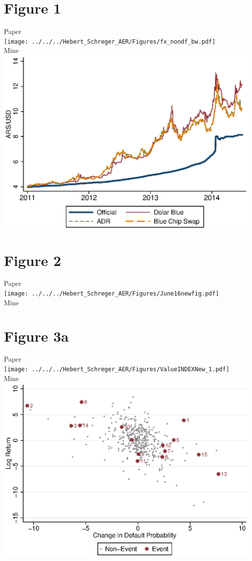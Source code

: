 \documentclass{article}
\begin{document}
\section{Figure 1}
Paper \\
\texttt{[image: ../../../Hebert\_Schreger\_AER/Figures/fx\_nondf\_bw.pdf]}\\
Mine \\
\includegraphics[scale = .8]{fx_nondf_bw.eps}\\

\newpage
\section{Figure 2}
Paper \\
\texttt{[image: ../../../Hebert\_Schreger\_AER/Figures/June16newfig.pdf]}\\
Mine \\
\newpage
\section{Figure 3a}
Paper \\
\texttt{[image: ../../../Hebert\_Schreger\_AER/Figures/ValueINDEXNew\_1.pdf]}\\
Mine \\
\includegraphics[scale = .8]{ValueINDEXNew_1.eps}\\
\newpage
\end{document}
